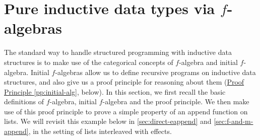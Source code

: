 \documentclass{jfp1}
\newcommand{\mbind}{\mathrel{>\kern-0.45em>\kern-0.45em=}}
\newtheorem{definition}{Definition}
\newcommand{\proofprinref}[1]{\hyperref[#1]{Proof Principle \ref*{#1}}}
\begin{document}


\section{Pure inductive data types via $f$-algebras}
\label{sec:f-algebras}

The standard way to handle structured programming with inductive data
structures is to make use of the categorical concepts of $f$-algebra
and initial $f$-algebra. Initial $f$-algebras allow us to define
recursive programs on inductive data structures, and also give us a
proof principle for reasoning about them
(\proofprinref{pp:initial-alg}, below). In this section, we first
recall the basic definitions of $f$-algebra, initial $f$-algebra and
the proof principle. We then make use of this proof principle to prove
a simple property of an append function on lists. We will revisit this
example below in \autoref{sec:direct-eappend} and
\autoref{sec:f-and-m-append}, in the setting of lists interleaved with
effects.
\end{document}
